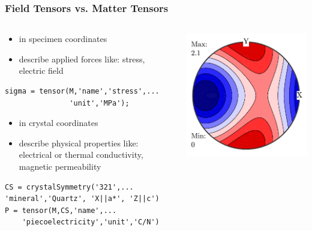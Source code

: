 \documentclass[compress]{beamer}
\begin{document}
\begin{frame}[fragile]
  \frametitle{Field Tensors vs. Matter Tensors}

  \begin{overlayarea}{\textwidth}{\textheight}

    \begin{columns}
      \begin{column}{0.7\textwidth}
        \begin{itemize}
        \item in specimen coordinates
        \item describe applied forces like:
          stress, electric field
        \end{itemize}
        \begin{lstlisting}[style=input]
sigma = tensor(M,'name','stress',...
               'unit','MPa');
        \end{lstlisting}

        \pause
        \medskip

        \begin{itemize}
        \item in crystal coordinates
        \item describe physical properties like: electrical or thermal
          conductivity, magnetic permeability
        \end{itemize}
        \begin{lstlisting}[style=input]
CS = crystalSymmetry('321',...
'mineral','Quartz', 'X||a*', 'Z||c')
P = tensor(M,CS,'name',...
    'piecoelectricity','unit','C/N')
        \end{lstlisting}


      \end{column}
      \begin{column}{0.28\textwidth}
        \includegraphics[width=\textwidth]{pic/sigma}


\end{column}
\end{columns}
\end{overlayarea}
\end{frame}
\end{document}
